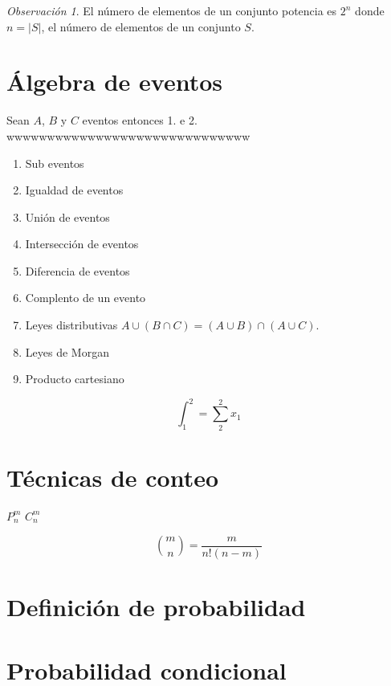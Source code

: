 \documentclass[
  11pt,
]{krantz}
\providecommand{\tightlist}{%
  \setlength{\itemsep}{0pt}\setlength{\parskip}{0pt}}
\theoremstyle{definition}
\theoremstyle{definition}
\theoremstyle{definition}
\theoremstyle{definition}
\theoremstyle{remark}
\newtheorem*{remark}{Observación}
\begin{document}
\begin{remark}
El número de elementos de un conjunto potencia es \(2^n\) donde \(n=\left\vert S\right\vert\), el número de elementos de un conjunto \(S\).
\end{remark}

\hypertarget{uxe1lgebra-de-eventos}{%
\chapter{Álgebra de eventos}\label{uxe1lgebra-de-eventos}}

Sean \(A\), \(B\) y \(C\) eventos entonces 1. e 2. wwwwwwwwwwwwwwwwwwwwwwwwwwwwww

\begin{enumerate}
\def\labelenumi{\arabic{enumi}.}
\tightlist
\item
  Sub eventos
\item
  Igualdad de eventos
\item
  Unión de eventos
\item
  Intersección de eventos
\item
  Diferencia de eventos
\item
  Complento de un evento
\item
  Leyes distributivas \(A\cup (B\cap C)=(A\cup B)\cap (A\cup C)\).
\item
  Leyes de Morgan
\item
  Producto cartesiano
\end{enumerate}

\[ \int_{1}^{2}=\sum_{2}^{2}x_1 \]

\hypertarget{tuxe9cnicas-de-conteo}{%
\chapter{Técnicas de conteo}\label{tuxe9cnicas-de-conteo}}

\(P_n^m\) \(C_n^m\)

\[\binom{m}{n}=\frac{m}{n!(n-m)}\]

\hypertarget{definiciuxf3n-de-probabilidad}{%
\chapter{Definición de probabilidad}\label{definiciuxf3n-de-probabilidad}}

\hypertarget{probabilidad-condicional}{%
\chapter{Probabilidad condicional}\label{probabilidad-condicional}}
\end{document}
